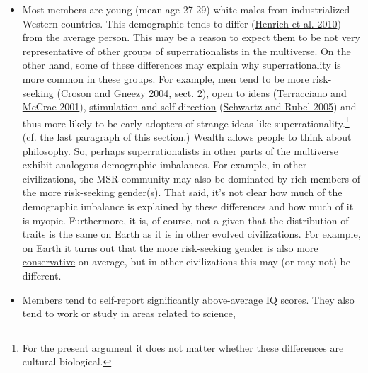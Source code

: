 \begin{itemize}
\item
  Most members are young (mean age 27-29) white males from
  industrialized Western countries. This demographic tends to differ
  (\href{http://hci.ucsd.edu/102b/readings/WeirdestPeople.pdf}{Henrich
  et al. 2010}) from the average person. This may be a reason to expect
  them to be not very representative of other groups of
  superrationalists in the multiverse. On the other hand, some of these
  differences may explain why superrationality is more common in these
  groups. For example, men tend to be
  \href{http://www.njl.nu/uploads/Forskning__Croson__Gneezy.pdf\#page=4}{more
  risk-seeking}
  (\href{http://www.njl.nu/uploads/Forskning__Croson__Gneezy.pdf}{Croson
  and Gneezy 2004}, sect. 2),
  \href{http://citeseerx.ist.psu.edu/viewdoc/download?doi=10.1.1.502.9219\&rep=rep1\&type=pdf}{open
  to ideas}
  (\href{http://citeseerx.ist.psu.edu/viewdoc/download?doi=10.1.1.502.9219\&rep=rep1\&type=pdf}{Terracciano
  and McCrae 2001}),
  \href{http://dip38.psi.uniroma1.it/sites/default/files/persone/sensalesg/materiale/Schwatrz\%20e\%20Rubel\%202005\%20sex\%20dif\%20in\%20value.pdf}{stimulation
  and self-direction}
  (\href{http://dip38.psi.uniroma1.it/sites/default/files/persone/sensalesg/materiale/Schwatrz\%20e\%20Rubel\%202005\%20sex\%20dif\%20in\%20value.pdf}{Schwartz
  and Rubel 2005}) and thus more likely to be early adopters of strange
  ideas like superrationality.\footnote{For the present argument it does
    not matter whether these differences are cultural biological.} (cf.
  the last paragraph of this section.) Wealth allows people to think
  about philosophy. So, perhaps superrationalists in other parts of the
  multiverse exhibit analogous demographic imbalances. For example, in
  other civilizations, the MSR community may also be dominated by rich
  members of the more risk-seeking gender(s). That said, it's not clear
  how much of the demographic imbalance is explained by these
  differences and how much of it is myopic. Furthermore, it is, of
  course, not a given that the distribution of traits is the same on
  Earth as it is in other evolved civilizations. For example, on Earth
  it turns out that the more risk-seeking gender is also
  \href{http://www.gallup.com/poll/120839/women-likely-democrats-regardless-age.aspx}{more
  conservative} on average, but in other civilizations this may (or may
  not) be different.
\item
  Members tend to self-report significantly above-average IQ scores.
  They also tend to work or study in areas related to science,

\end{itemize}
